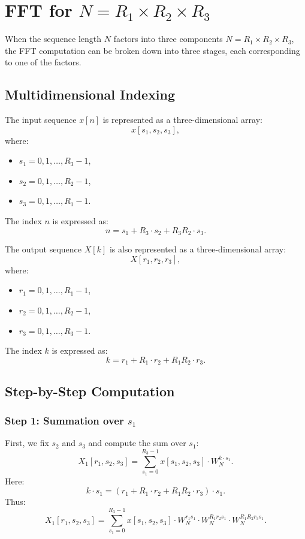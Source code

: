 \documentclass{article}
\begin{document}
\section{FFT for \( N = R_1 \times R_2 \times R_3 \)}
When the sequence length \( N \) factors into three components \( N = R_1 \times R_2 \times R_3 \), the FFT computation can be broken down into three stages, each corresponding to one of the factors.

\subsection{Multidimensional Indexing}
The input sequence \( x[n] \) is represented as a three-dimensional array:
\[
x[s_1, s_2, s_3],
\]
where:
\begin{itemize}
    \item \( s_1 = 0, 1, \dots, R_3 - 1 \),
    \item \( s_2 = 0, 1, \dots, R_2 - 1 \),
    \item \( s_3 = 0, 1, \dots, R_1 - 1 \).
\end{itemize}
The index \( n \) is expressed as:
\[
n = s_1 + R_3 \cdot s_2 + R_3 R_2 \cdot s_3.
\]

The output sequence \( X[k] \) is also represented as a three-dimensional array:
\[
X[r_1, r_2, r_3],
\]
where:
\begin{itemize}
    \item \( r_1 = 0, 1, \dots, R_1 - 1 \),
    \item \( r_2 = 0, 1, \dots, R_2 - 1 \),
    \item \( r_3 = 0, 1, \dots, R_3 - 1 \).
\end{itemize}
The index \( k \) is expressed as:
\[
k = r_1 + R_1 \cdot r_2 + R_1 R_2 \cdot r_3.
\]

\subsection{Step-by-Step Computation}
\subsubsection{Step 1: Summation over \( s_1 \)}
First, we fix \( s_2 \) and \( s_3 \) and compute the sum over \( s_1 \):
\[
X_1[r_1, s_2, s_3] = \sum_{s_1=0}^{R_3-1} x[s_1, s_2, s_3] \cdot W_N^{k \cdot s_1}.
\]
Here:
\[
k \cdot s_1 = (r_1 + R_1 \cdot r_2 + R_1 R_2 \cdot r_3) \cdot s_1.
\]
Thus:
\[
X_1[r_1, s_2, s_3] = \sum_{s_1=0}^{R_3-1} x[s_1, s_2, s_3] \cdot W_N^{r_1 s_1} \cdot W_N^{R_1 r_2 s_1} \cdot W_N^{R_1 R_2 r_3 s_1}.
\]
\end{document}
